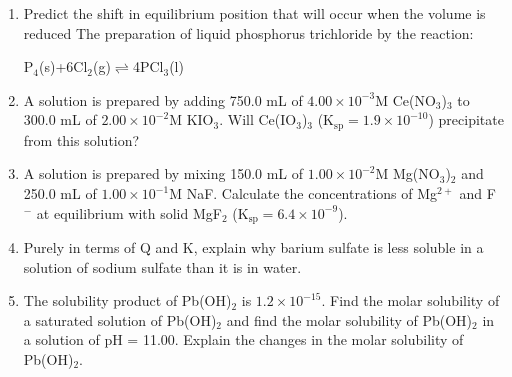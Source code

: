 \documentclass[../chem.tex]{subfiles}
\begin{document}
\begin{enumerate}
    \item Predict the shift in equilibrium position that will occur when the volume is reduced
    The preparation of liquid phosphorus trichloride by the reaction:
    \begin{center}
        P$_4$(s)+6Cl$_2$(g)$\rightleftharpoons$4PCl$_3$(l)
    \end{center}
    \item A solution is prepared by adding 750.0 mL of $4.00\times 10^{-3}$M Ce(NO$_3$)$_3$ to 300.0 mL of $2.00\times 10^{-2}$M KIO$_3$.
    Will Ce(IO$_3$)$_3$ (K$_{\text{sp}}=1.9\times 10^{-10}$) precipitate from this solution?
    \item A solution is prepared by mixing 150.0 mL of $1.00\times 10^{-2}$M Mg(NO$_3$)$_2$ and 250.0 mL of $1.00\times 10^{-1}$M NaF. Calculate the concentrations of Mg$^{2+}$ and F$^-$ at equilibrium with solid MgF$_2$ (K$_{\text{sp}}=6.4\times 10^{-9}$).
    \item Purely in terms of Q and K, explain why barium sulfate is less soluble in a solution of sodium sulfate than it is in water.
    \item The solubility product of Pb(OH)$_2$ is $1.2\times 10^{-15}$. Find the molar solubility of a saturated solution of Pb(OH)$_2$ and find the molar solubility of Pb(OH)$_2$ in a solution of pH = 11.00. Explain the changes in the molar solubility of Pb(OH)$_2$.
\end{enumerate}
\end{document}
